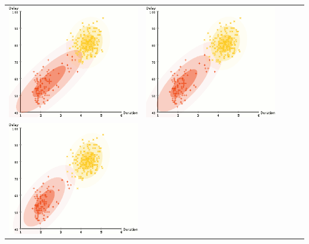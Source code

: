 \documentclass{beamer}
\begin{document}
\begin{frame}
{\begin{tabular}{ccccc}
\includegraphics[scale=0.2]{em/frame_03_delay-0}&
\includegraphics[scale=0.2]{em/frame_04_delay-0}\\
\includegraphics[scale=0.2]{em/frame_05_delay-0}&

\end{tabular}}
\end{frame}
\end{document}

